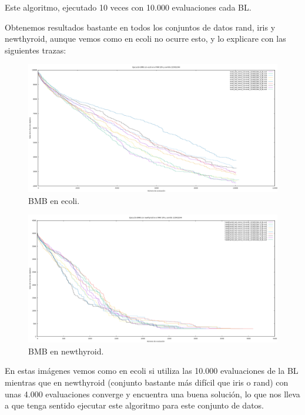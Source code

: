 \documentclass[12pt, spanish]{article}
\begin{document}
Este algoritmo, ejecutado 10 veces con 10.000 evaluaciones cada BL.

Obtenemos resultados bastante en todos los conjuntos de datos rand, iris y newthyroid, aunque vemos como en ecoli no ocurre esto, y lo explicare con las siguientes trazas:

\begin{figure}[H]
	\centering
	\hspace*{-1.7cm}\includegraphics[scale = 0.40]{bmb-ecoli.png}
	
	\caption{BMB en ecoli.}
	\label{fig:bmb-cmp1}
\end{figure}

\begin{figure}[H]
	\centering
	\hspace*{-1.7cm}\includegraphics[scale = 0.40]{bmb-newthyroid.png}
	
	\caption{BMB en newthyroid.}
	\label{fig:bmb-cmp2}
\end{figure}


En estas imágenes vemos como en ecoli si utiliza las 10.000 evaluaciones de la BL mientras que en newthyroid (conjunto bastante más difícil que iris o rand) con unas 4.000 evaluaciones converge y encuentra una buena solución, lo que nos lleva a que tenga sentido ejecutar este algoritmo para este conjunto de datos. 
\end{document}
